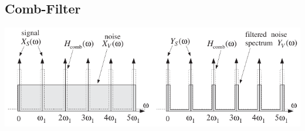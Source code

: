 	\subsection{Comb-Filter}
		\vspace*{-0.3cm}\begin{minipage}{0.625\textwidth}
			\includegraphics[width = \textwidth]{pic/combFilter.pdf}\\[1.9cm]
		\end{minipage}\begin{minipage}[t]{0.075\textwidth}$ $\end{minipage}
